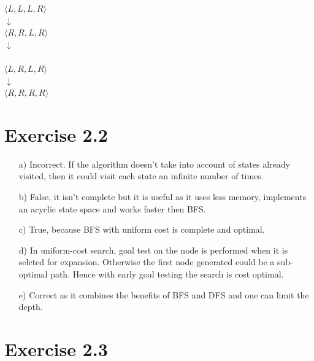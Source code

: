 \documentclass[12pt]{article}
\begin{document}
$\langle L,L,L,R \rangle$ \\ \hspace*{35mm}%
$\downarrow$ \\ \hspace*{25mm}%
$\langle R,R,L,R \rangle$ \\ \hspace*{35mm}%
$\downarrow$ \\ \\ \hspace*{25mm}%
$\langle L,R,L,R \rangle$ \\ \hspace*{35mm}%
$\downarrow$ \\ \hspace*{25mm}%
$\langle R,R,R,R \rangle$ \newpage


\section*{Exercise 2.2}

\begin{enumerate}
    \item[a)] Incorrect. If the algorithm doesn't take into account of states already visited, then it could visit each state an infinite number of times. 
    \item[b)] False, it isn't complete but it is useful as it uses less memory, implements an acyclic state space and works faster then BFS.  
    \item[c)] True, because BFS with uniform cost is complete and optimal.
    \item[d)] In uniform-cost search, goal test on the node is performed when it is selcted for expansion. Otherwise the first node generated could be a sub-optimal path. Hence with early goal testing the search is cost optimal.
    \item[e)] Correct as it combines the benefits of BFS and DFS and one can limit the depth.\newline
\end{enumerate}

\section*{Exercise 2.3}

\end{document}
